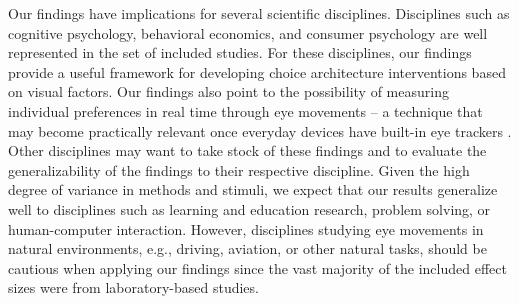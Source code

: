 \documentclass[english,natbib,man,floatsintext]{apa6}
\begin{document}
Our findings have implications for several scientific disciplines. Disciplines such as cognitive psychology, behavioral economics, and consumer psychology are well represented in the set of included studies. For these disciplines, our findings provide a useful framework for developing choice architecture interventions \citep{muenscher2016a} based on visual factors. Our findings also point to the possibility of measuring individual preferences in real time through eye movements -- a technique that may become practically relevant once everyday devices have built-in eye trackers \citep{bulling2019a}. Other disciplines may want to take stock of these findings and to evaluate the generalizability of the findings to their respective discipline. Given the high degree of variance in methods and stimuli, we expect that our results generalize well to disciplines such as learning and education research, problem solving, or human-computer interaction. However, disciplines studying eye movements in natural environments, e.g., driving, aviation, or other natural tasks, should be cautious when applying our findings since the vast majority of the included effect sizes were from laboratory-based studies. 
\end{document}
